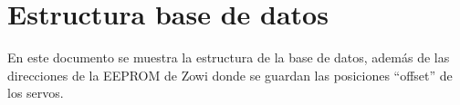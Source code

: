 
\chapter{Estructura base de datos} %

\label{app:dbsctruct} %

En este documento se muestra la estructura de la base de datos, además de las direcciones de la EEPROM de Zowi donde se guardan las posiciones ``offset'' de los servos.

\newpage


